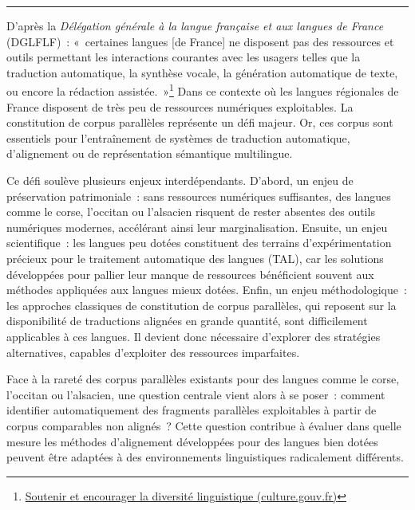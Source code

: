 \noindent\rule{\textwidth}{0.4pt}

D'après la \textit{Délégation générale à la langue française et aux langues de France} (DGLFLF)~:
«~certaines langues [de France] ne disposent pas des ressources et outils permettant les interactions
courantes avec les usagers telles que la traduction automatique, la synthèse vocale, la génération
automatique de texte, ou encore la rédaction assistée.~»\footnote{
    \href{https://www.culture.gouv.fr/thematiques/langue-francaise-et-langues-de-france/agir-pour-les-langues/innover-dans-le-domaine-des-langues-et-du-numerique/soutenir-et-encourager-la-diversite-linguistique-dans-le-domaine-numerique}
    {Soutenir et encourager la diversité linguistique (culture.gouv.fr)}
}
Dans ce contexte où les langues régionales de France disposent de très peu de ressources numériques
exploitables. La constitution de corpus parallèles représente un défi majeur. Or, ces corpus sont
essentiels pour l’entraînement de systèmes de traduction automatique, d’alignement ou de représentation
sémantique multilingue.

Ce défi soulève plusieurs enjeux interdépendants. D'abord, un enjeu de préservation patrimoniale~:
sans ressources numériques suffisantes, des langues comme le corse, l'occitan ou l'alsacien risquent de rester
absentes des outils numériques modernes, accélérant ainsi leur marginalisation. Ensuite, un enjeu scientifique~:
les langues peu dotées constituent des terrains d'expérimentation
précieux pour le traitement automatique des langues (TAL), car les solutions développées pour pallier leur manque de ressources bénéficient
souvent aux méthodes appliquées aux langues mieux dotées. Enfin, un enjeu méthodologique~:
les approches classiques de constitution de corpus parallèles, qui reposent sur la disponibilité de
traductions alignées en grande quantité, sont difficilement applicables à ces langues. Il devient donc
nécessaire d'explorer des stratégies alternatives, capables d'exploiter des ressources imparfaites.

Face à la rareté des corpus parallèles existants pour des langues comme le corse, l’occitan ou l’alsacien,
une question centrale vient alors à se poser~: comment identifier automatiquement des fragments parallèles exploitables
à partir de corpus comparables non alignés~? Cette question contribue
à évaluer dans quelle mesure les méthodes d'alignement développées pour des
langues bien dotées peuvent être adaptées à des environnements linguistiques radicalement différents.

